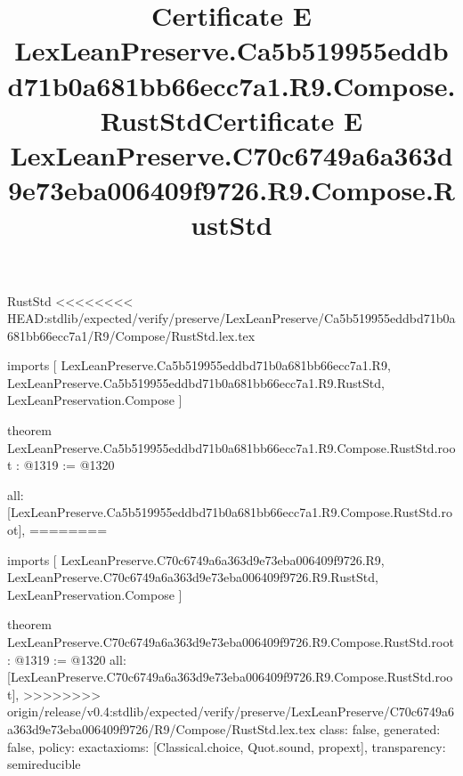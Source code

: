 \begin{lexlean}{RustStd}
<<<<<<<< HEAD:stdlib/expected/verify/preserve/LexLeanPreserve/Ca5b519955eddbd71b0a681bb66ecc7a1/R9/Compose/RustStd.lex.tex
\title{Certificate E LexLeanPreserve.Ca5b519955eddbd71b0a681bb66ecc7a1.R9.Compose.RustStd}
\begin{coremodule}
imports [
  LexLeanPreserve.Ca5b519955eddbd71b0a681bb66ecc7a1.R9,
  LexLeanPreserve.Ca5b519955eddbd71b0a681bb66ecc7a1.R9.RustStd,
  LexLeanPreservation.Compose
]

theorem LexLeanPreserve.Ca5b519955eddbd71b0a681bb66ecc7a1.R9.Compose.RustStd.root : @1319 := @1320 {
  all: [LexLeanPreserve.Ca5b519955eddbd71b0a681bb66ecc7a1.R9.Compose.RustStd.root],
========
\title{Certificate E LexLeanPreserve.C70c6749a6a363d9e73eba006409f9726.R9.Compose.RustStd}
\begin{coremodule}
imports [
  LexLeanPreserve.C70c6749a6a363d9e73eba006409f9726.R9,
  LexLeanPreserve.C70c6749a6a363d9e73eba006409f9726.R9.RustStd,
  LexLeanPreservation.Compose
]

theorem LexLeanPreserve.C70c6749a6a363d9e73eba006409f9726.R9.Compose.RustStd.root : @1319 := @1320 {
  all: [LexLeanPreserve.C70c6749a6a363d9e73eba006409f9726.R9.Compose.RustStd.root],
>>>>>>>> origin/release/v0.4:stdlib/expected/verify/preserve/LexLeanPreserve/C70c6749a6a363d9e73eba006409f9726/R9/Compose/RustStd.lex.tex
  class: false,
  generated: false,
  policy: exact{axioms: [Classical.choice, Quot.sound, propext]},
  transparency: semireducible
}


\end{coremodule}}
\end{coremodule}
\end{lexlean}
